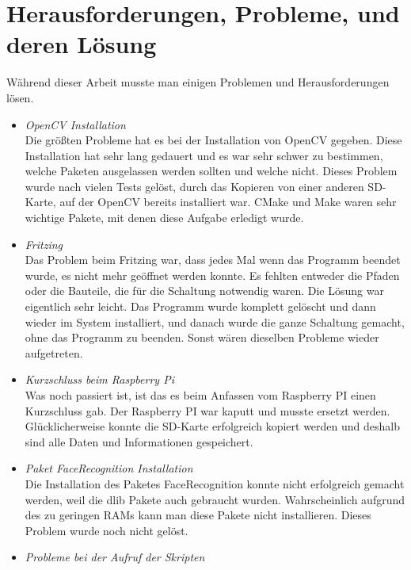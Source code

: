 	\section{Herausforderungen, Probleme, und deren Lösung}
	W{\"a}hrend dieser Arbeit musste man einigen Problemen und Herausforderungen lösen.
	\begin{itemize}
		\item \textit{OpenCV Installation}\\
		
		Die gr{\"o}ßten Probleme hat es bei der Installation von OpenCV gegeben. Diese Installation hat sehr lang gedauert und es war sehr schwer zu bestimmen, welche Paketen ausgelassen werden sollten und welche nicht. Dieses Problem wurde nach vielen Tests gel{\"o}st, durch das Kopieren von einer anderen SD-Karte, auf der OpenCV bereits installiert war. CMake und Make waren sehr wichtige Pakete, mit denen diese Aufgabe erledigt wurde.
		\item \textit{Fritzing} \\
		
		Das Problem beim Fritzing war, dass jedes Mal wenn das Programm beendet wurde, es nicht mehr ge{\"o}ffnet werden konnte. Es fehlten entweder die Pfaden oder die Bauteile, die f{\"u}r  die Schaltung notwendig waren. Die L{\"o}sung war eigentlich sehr leicht. Das Programm wurde komplett gel{\"o}scht und dann wieder im System installiert, und danach wurde die ganze Schaltung gemacht, ohne das Programm zu beenden. Sonst wären dieselben Probleme wieder aufgetreten.
		\item \textit{Kurzschluss beim Raspberry Pi}\\
		
		Was noch passiert ist, ist das es beim Anfassen vom Raspberry PI einen Kurzschluss gab. Der Raspberry PI war kaputt und musste ersetzt werden. Glücklicherweise konnte die SD-Karte erfolgreich kopiert werden und deshalb sind alle Daten und Informationen gespeichert.
		
		\item \textit{Paket FaceRecognition Installation} \\
		
		Die Installation des Paketes FaceRecognition konnte nicht erfolgreich gemacht werden, weil die dlib Pakete auch gebraucht wurden. Wahrscheinlich aufgrund des zu geringen RAMs kann man diese Pakete nicht installieren. Dieses Problem wurde noch nicht gel{\"o}st.
		
		\item \textit{Probleme bei der Aufruf der Skripten } \\
		

\end{itemize}

